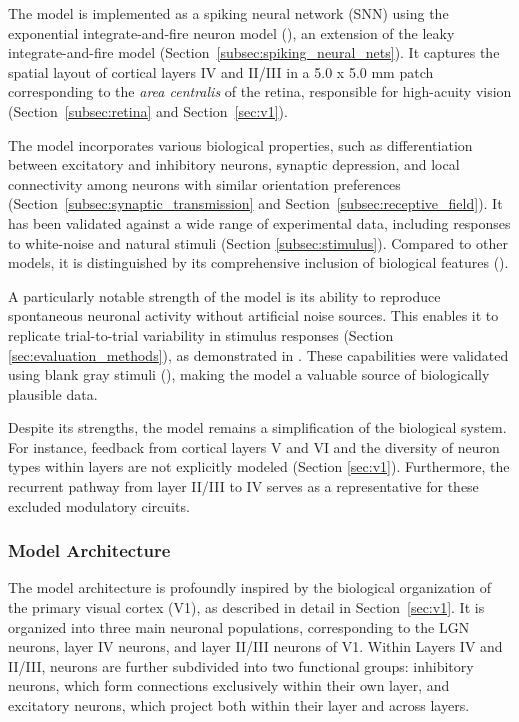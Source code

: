 The model is implemented as a spiking neural network (SNN) using the exponential integrate-and-fire neuron model (\citet{FourcaudTrocm11628}), an extension of the leaky integrate-and-fire model (Section~\ref{subsec:spiking_neural_nets}). It captures the spatial layout of cortical layers IV and II/III in a 5.0 x 5.0 mm patch corresponding to the \emph{area centralis} of the retina, responsible for high-acuity vision (Section~\ref{subsec:retina} and Section~\ref{sec:v1}).

The model incorporates various biological properties, such as differentiation between excitatory and inhibitory neurons, synaptic depression, and local connectivity among neurons with similar orientation preferences (Section~\ref{subsec:synaptic_transmission} and Section~\ref{subsec:receptive_field}). It has been validated against a wide range of experimental data, including responses to white-noise and natural stimuli (Section \ref{subsec:stimulus}). Compared to other models, it is distinguished by its comprehensive inclusion of biological features (\citet{antolik2024comprehensive}).

A particularly notable strength of the model is its ability to reproduce spontaneous neuronal activity without artificial noise sources. This enables it to replicate trial-to-trial variability in stimulus responses (Section \ref{sec:evaluation_methods}), as demonstrated in \citet{baudot_animation_2013}. These capabilities were validated using blank gray stimuli (\citet{PAPAIOANNOU1972558}), making the model a valuable source of biologically plausible data.

Despite its strengths, the model remains a simplification of the biological system. For instance, feedback from cortical layers V and VI and the diversity of neuron types within layers are not explicitly modeled (Section \ref{sec:v1}). Furthermore, the recurrent pathway from layer II/III to IV serves as a representative for these excluded modulatory circuits.

\subsubsection{Model Architecture}
\label{subsubsec:spiking_cat_architecture}
The model architecture is profoundly inspired by the biological organization of the primary visual cortex (V1), as described in detail in Section~\ref{sec:v1}. It is organized into three main neuronal populations, corresponding to the LGN neurons, layer IV neurons, and layer II/III neurons of V1. Within Layers IV and II/III, neurons are further subdivided into two functional groups: inhibitory neurons, which form connections exclusively within their own layer, and excitatory neurons, which project both within their layer and across layers.

